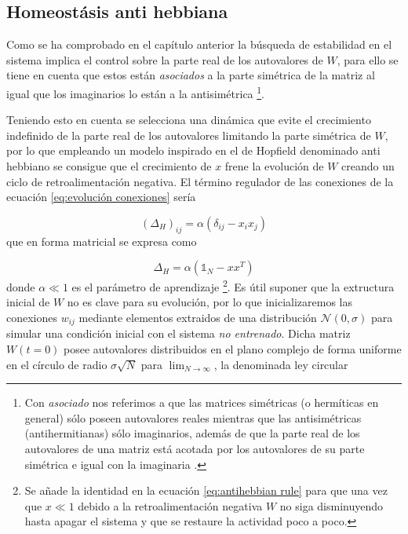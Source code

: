 \documentclass[11pt,a4paper,twoside,pdf]{article}
\begin{document}
\subsection{Homeostásis anti hebbiana}
Como se ha comprobado en el capítulo anterior la búsqueda de estabilidad en el sistema implica el control sobre la parte real de los autovalores de \(W\), para ello se tiene en cuenta que estos están \emph{asociados} a la parte simétrica de la matriz al igual que los imaginarios lo están a la antisimétrica \footnote{Con \emph{asociado} nos referimos a que las matrices simétricas (o hermíticas en general) sólo poseen autovalores reales mientras que las antisimétricas (antihermitianas) sólo imaginarios, además de que la parte real de los autovalores de una matriz está acotada por los autovalores de su parte simétrica e igual con la imaginaria \cite{bendixson1902}.}.

Teniendo esto en cuenta se selecciona una dinámica que evite el crecimiento indefinido de la parte real de los autovalores limitando la parte simétrica de \(W\), por lo que empleando un modelo inspirado en el de Hopfield \cite{hopfield1982} denominado anti hebbiano \cite{magnasco2009} se consigue que el crecimiento de \(x\) frene la evolución de \(W\) creando un ciclo de retroalimentación negativa. El término regulador de las conexiones de la ecuación \eqref{eq:evolución conexiones} sería

\begin{equation}
  (\Delta_H)_{ij} = \alpha(\delta_{ij} - x_i x_j)
\end{equation}
que en forma matricial se expresa como 

\begin{equation}
  \Delta_H = \alpha\left(\mathbb{1}_N - xx^T\right)
  \label{eq:antihebbian rule}
\end{equation}
donde \(\alpha \ll 1\) es el parámetro de aprendizaje \footnote{Se añade la identidad en la ecuación \eqref{eq:antihebbian rule} para que una vez que \(x \ll 1\) debido a la retroalimentación negativa \(W\) no siga disminuyendo hasta apagar el sistema y que se restaure la actividad poco a poco.}. Es útil suponer que la extructura inicial de \(W\) no es clave para su evolución, por lo que inicializaremos las conexiones \(w_{ij}\) mediante elementos extraidos de una distribución \(\mathcal{N}(0, \sigma)\) para simular una condición inicial con el sistema \emph{no entrenado}. Dicha matriz \(W(t=0)\) posee autovalores distribuidos en el plano complejo de forma uniforme en el círculo de radio \(\sigma\sqrt{N}\) para \(\lim_{N\rightarrow \infty}\), la denominada ley circular  \cite{tao2010}
\end{document}

